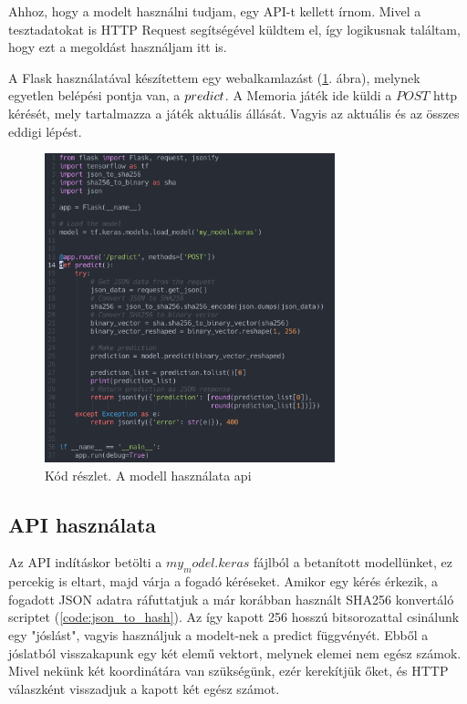 Ahhoz, hogy a modelt használni tudjam, egy API-t kellett írnom. Mivel a tesztadatokat is HTTP Request segítségével küldtem el, így logikusnak találtam, hogy ezt a megoldást használjam itt is. 

A Flask használatával készítettem egy webalkamlazást (\ref{code:use_model}. ábra), melynek egyetlen belépési pontja van, a $\/predict$. A Memoria játék ide küldi a $POST$ http kérését, mely tartalmazza a játék aktuális állását. Vagyis az aktuális és az összes eddigi lépést. 
\begin{figure}[h]
    \center
    \includegraphics[width=0.75\textwidth]{img/use_model.png}
    \caption{Kód részlet. A modell használata api}
    \label{code:use_model}
\end{figure}

\subsection{API használata}

Az API indításkor betölti a $my_model.keras$ fájlból a betanított modellünket, ez percekig is eltart, majd várja a fogadó kéréseket. 
Amikor egy kérés érkezik, a fogadott JSON adatra ráfuttatjuk a már korábban használt SHA256 konvertáló scriptet (\ref{code:json_to_hash}).
Az így kapott 256 hosszú bitsorozattal csinálunk egy "jóslást", vagyis használjuk a modelt-nek a predict függvényét. Ebből a jóslatból visszakapunk egy két elemű vektort, melynek elemei nem egész számok.
 Mivel nekünk két koordinátára van szükségünk, ezér kerekítjük őket, és HTTP válaszként visszadjuk a kapott két egész számot. 

